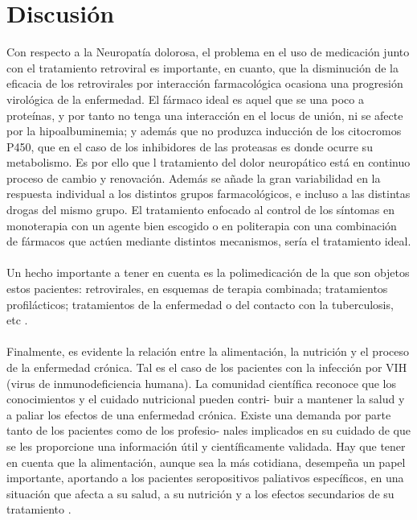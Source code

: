 \documentclass[a4paper,twocolumn,10pt]{article}
\begin{document}
\section{Discusión}
Con respecto a la Neuropatía dolorosa, el problema en el uso de medicación junto con el tratamiento retroviral es importante, en cuanto, que la disminución de la eficacia de los retrovirales por interacción farmacológica ocasiona una progresión virológica de la enfermedad. El fármaco ideal es aquel que se una poco a proteínas, y por tanto no tenga una interacción en el locus de unión, ni se afecte por la hipoalbuminemia; y además que no produzca inducción de los citocromos P450, que en el caso de los inhibidores de las proteasas es donde ocurre su metabolismo. Es por ello que l tratamiento del dolor neuropático está en continuo proceso de cambio y renovación. Además se añade la gran variabilidad en la respuesta individual a los distintos grupos farmacológicos, e incluso a las distintas drogas del mismo grupo. El tratamiento enfocado al control de los síntomas en monoterapia con un agente bien escogido o en politerapia con una combinación de fármacos que actúen mediante distintos mecanismos, sería el tratamiento ideal.\\ \\
Un hecho importante a tener en cuenta es la polimedicación de la que son objetos estos pacientes: retrovirales, en esquemas de terapia combinada; tratamientos profilácticos; tratamientos de la enfermedad o del contacto con la tuberculosis, etc \cite{Ferri2002}. \\ \\
Finalmente, es evidente la relación entre la alimentación, la nutrición y el proceso de la enfermedad crónica. Tal es el caso de los pacientes con la infección por VIH (virus de inmunodeficiencia humana). La comunidad científica reconoce que los conocimientos y el cuidado nutricional pueden contri-
buir a mantener la salud y a paliar los efectos de una enfermedad crónica. Existe una demanda por parte tanto de los pacientes como de los profesio-
nales implicados en su cuidado de que se les proporcione una información útil y científicamente validada. Hay que tener en cuenta que la alimentación, aunque sea la más cotidiana, desempeña un papel importante, aportando a los pacientes seropositivos paliativos específicos, en una situación que afecta a su salud, a su nutrición y a los efectos secundarios de su tratamiento \cite{Herrera2004}.
\end{document}
